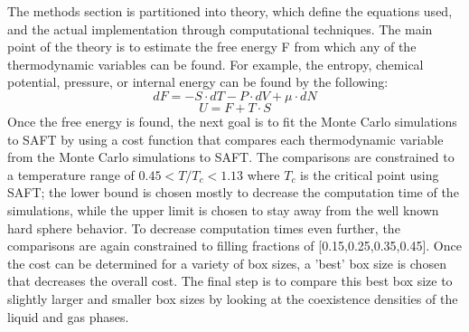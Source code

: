 ﻿%
\newcommand\numberthis{\addtocounter{equation}{1}\tag{\theequation}}
The methods section is partitioned into theory, which define the equations used, and the actual implementation through computational techniques. The main point of the theory is to estimate the free energy F from which any of the thermodynamic variables can be found. For example, the entropy, chemical potential, pressure, or internal energy can be found by the following:
\begin{equation}
dF=-S\cdot dT -P\cdot dV+\mu\cdot dN
\end{equation}
\begin{equation}U=F+T\cdot S 
\end{equation} 
Once the free energy is found, the next goal is to fit the Monte Carlo simulations to SAFT by using a cost function that compares each thermodynamic variable from the Monte Carlo simulations to SAFT. The comparisons are constrained to a temperature range of $0.45<T/T_c<1.13$ where $T_c$ is the critical point using SAFT; the lower bound is chosen mostly to decrease the computation time of the simulations, while the upper limit is chosen to stay away from the well known hard sphere behavior. To decrease computation times even further, the comparisons are again constrained to filling fractions of [0.15,0.25,0.35,0.45]. Once the cost can be determined for a variety of box sizes, a 'best' box size is chosen that decreases the overall cost. The final step is to compare this best box size to slightly larger and smaller box sizes by looking at the coexistence densities of the liquid and gas phases.
